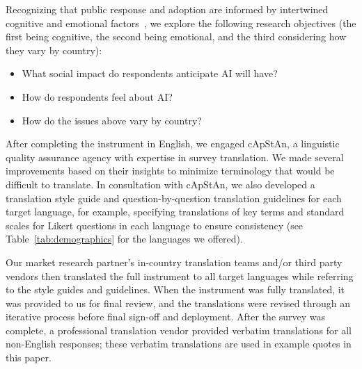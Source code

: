 \documentclass[sigconf]{acmart}
\begin{document}
Recognizing that public response and adoption are informed by intertwined cognitive and emotional factors~\cite{homburg2006, lin2004}, we explore the following research objectives (the first being cognitive, the second being emotional, and the third considering how they vary by country):

\begin{itemize}[label={--}]
\item What social impact do respondents anticipate AI will have?
\item How do respondents feel about AI?
\item How do the issues above vary by country?
\end{itemize}

After completing the instrument in English, we engaged cApStAn, a linguistic quality assurance agency with expertise in survey translation. We made several improvements based on their insights to minimize terminology that would be difficult to translate. In consultation with cApStAn, we also developed a translation style guide and question-by-question translation guidelines for each target language, for example, specifying translations of key terms and standard scales for Likert questions in each language to ensure consistency (see Table~\ref{tab:demographics} for the languages we offered).

Our market research partner's in-country translation teams and/or third party vendors then translated the full instrument to all target languages while referring to the style guides and guidelines. When the instrument was fully translated, it was provided to us for final review, and the translations were revised through an iterative process before final sign-off and deployment. After the survey was complete, a professional translation vendor provided verbatim translations for all non-English responses; these verbatim translations are used in example quotes in this paper.
\end{document}
